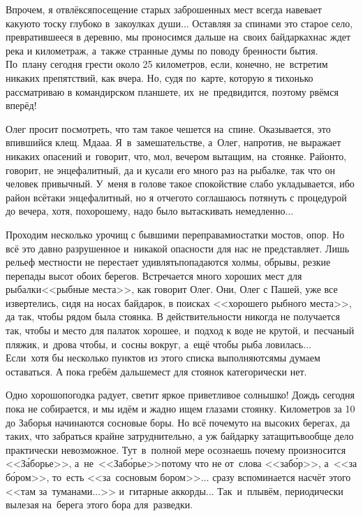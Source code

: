 Впрочем, я отвлёкся\mdash посещение старых заброшенных мест всегда навевает какую\sdash то тоску глубоко в~закоулках души$\ldots$ Оставляя за спинами это старое село, превратившееся в деревню, мы проносимся дальше на~своих байдарках\mdash нас ждет река и километраж, а~также странные думы по поводу бренности бытия. По~плану сегодня грести около 25 километров, если, конечно, не~встретим никаких препятствий, как вчера. Но, судя по~карте, которую я тихонько рассматриваю в командирском планшете, их~не~предвидится, поэтому рвёмся вперёд!

Олег просит посмотреть, что там такое чешется на~спине. Оказывается, это впившийся клещ. Мда\sdash а\sdash а. Я~в~замешательстве, а~Олег, напротив, не выражает никаких опасений и~говорит, что, мол, вечером вытащим, на~стоянке. Район\sdash то, говорит, не энцефалитный, да и кусали его много раз на рыбалке, так что он человек привычный. У~меня в голове такое спокойствие слабо укладывается, ибо район всё\sdash таки энцефалитный, но я отчего\sdash то соглашаюсь потянуть с процедурой до вечера, хотя, по\sdash хорошему, надо было вытаскивать немедленно$\ldots$

Проходим несколько урочищ с бывшими переправами\mdash остатки мостов, опор. Но всё это давно разрушенное и~никакой опасности для нас не представляет. Лишь рельеф местности не перестает удивлять\mdash попадаются холмы, обрывы, резкие перепады высот обоих берегов. Встречается много хороших мест для рыбалки\mdash <<рыбные места>>, как говорит Олег. Они, Олег с Пашей, уже все извертелись, сидя на носах байдарок, в поисках <<хорошего рыбного места>>, да так, чтобы рядом была стоянка. В действительности никогда не получается так, чтобы и место для палаток хорошее, и~подход к воде не крутой, и~песчаный пляжик, и~дрова чтобы, и~сосны вокруг, а~ещё чтобы рыба ловилась$\ldots$ Если~хотя бы несколько пунктов из этого списка выполняются\mdash мы думаем оставаться. А пока гребём дальше\mdash мест для стоянок категорически нет.

Одно хорошо\mdash погодка радует, светит яркое приветливое солнышко! Дождь сегодня пока не собирается, и мы идём и жадно ищем глазами стоянку. Километров за 10 до Заборья начинаются сосновые боры. Но всё почему\sdash то на высоких берегах, да таких, что забраться крайне затруднительно, а уж байдарку затащить\mdash вообще дело практически невозможное. Тут~в~полной мере осознаешь почему произносится <<З\'{а}борье>>, а~не~<<Заб\'{о}рье>>\mdash потому что не от~слова <<заб\'{о}р>>, а~<<за б\'{о}ром>>, то~есть <<за~сосновым бором>>$\ldots$ сразу вспоминается насчёт этого <<там за~туманами$\ldots$>> и~гитарные аккорды$\ldots$ Так~и~плывём, периодически вылезая на~берега этого бора для~разведки.

